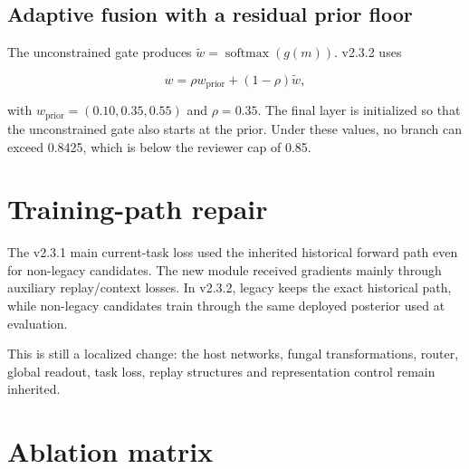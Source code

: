 \documentclass[11pt,a4paper]{article}
\begin{document}
\subsection{Adaptive fusion with a residual prior floor}

The unconstrained gate produces $\tilde{w}=\operatorname{softmax}(g(m))$. v2.3.2 uses

\begin{equation}
w=\rho w_{\mathrm{prior}}+(1-\rho)\tilde{w},
\end{equation}

with $w_{\mathrm{prior}}=(0.10,0.35,0.55)$ and $\rho=0.35$. The final layer is initialized so that the unconstrained gate also starts at the prior. Under these values, no branch can exceed 0.8425, which is below the reviewer cap of 0.85.



\section{Training-path repair}

The v2.3.1 main current-task loss used the inherited historical forward path even for non-legacy candidates. The new module received gradients mainly through auxiliary replay/context losses. In v2.3.2, legacy keeps the exact historical path, while non-legacy candidates train through the same deployed posterior used at evaluation.



This is still a localized change: the host networks, fungal transformations, router, global readout, task loss, replay structures and representation control remain inherited.

\section{Ablation matrix}
\end{document}
